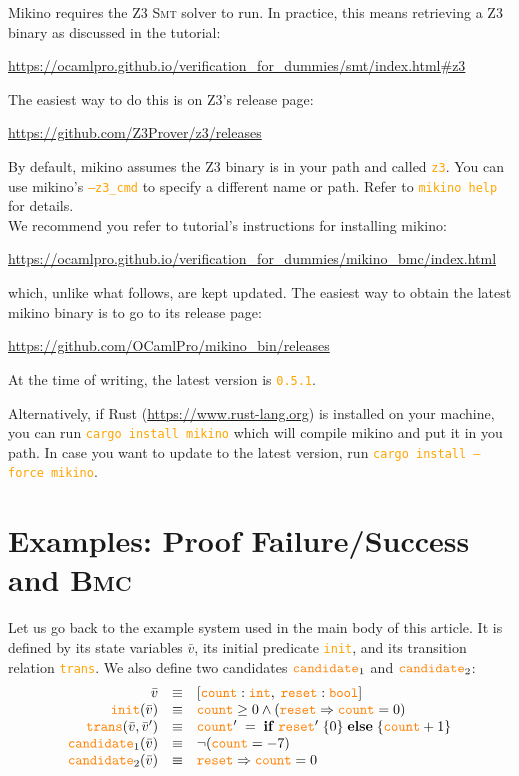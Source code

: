 \documentclass{easychair}
\newcommand{\Mkn}{Mikino}
\newcommand{\mkn}{mikino}
\newcommand{\rust}{Rust}
\newcommand{\smt}{\textsc{Smt}}
\newcommand{\bmc}{\textsc{Bmc}}
\newcommand{\mbld}[1]{\mathbf{#1}}
\newcommand{\code}[1]{\textcolor{orange}{\texttt{#1}}}
\newcommand{\vars}{\bar{v}}
\newcommand{\tyint}{\code{int}}
\newcommand{\tybool}{\code{bool}}
\newcommand{\init}{\code{init}}
\newcommand{\trans}{\code{trans}}
\newcommand{\cand}{\code{candidate}}
\newcommand{\impl}{\Rightarrow}
\begin{document}
\Mkn{} requires the Z3 \smt{} solver to run. In practice, this means retrieving a Z3 binary as
discussed in the tutorial:
%
\begin{center}
    \url{https://ocamlpro.github.io/verification_for_dummies/smt/index.html\#z3}
\end{center}
%
The easiest way to do this is on Z3's release page:
%
\begin{center}
    \url{https://github.com/Z3Prover/z3/releases}
\end{center}
%
By default, \mkn{} assumes the Z3 binary is in your path and called \code{z3}. You can use \mkn{}'s
\code{--z3\_cmd} to specify a different name or path. Refer to \code{mikino help} for details.
%
\\
%
We recommend you refer to tutorial's instructions for installing \mkn{}:
%
\begin{center}
    \url{https://ocamlpro.github.io/verification_for_dummies/mikino_bmc/index.html}%
\end{center}
%
which, unlike what follows, are kept updated. The easiest way to obtain the latest \mkn{} binary is
to go to its release page:
%
\begin{center}
    \url{https://github.com/OCamlPro/mikino_bin/releases}
\end{center}
%
At the time of writing, the latest version is \code{0.5.1}.

Alternatively, if \rust{} (\url{https://www.rust-lang.org}) is installed on your machine, you can
run \code{cargo install mikino} which will compile \mkn{} and put it in you path. In case you want
to update to the latest version, run \code{cargo install --force mikino}.

\section{Examples: Proof Failure/Success and \bmc{}}%
\label{app:example}

Let us go back to the example system used in the main body of this article. It is defined by its
state variables \(\vars\), its initial predicate \init{}, and its transition relation \trans{}.
We also define two candidates \(\cand_1\) and \(\cand_2\):
%
\[\begin{array}{r c l}
    \vars
        & \equiv
        & [ \code{count}: \tyint,\; \code{reset}: \tybool ]
    \\
    \init(\vars)
        & \equiv
        & \code{count} \geq 0 \land (\code{reset} \impl \code{count} = 0)
    \\
    \trans(\vars, \vars')
        & \equiv
        & \code{count}' \;=\;
            \mbld{if} \; \code{reset}' \; \{ 0 \} \;
            \mbld{else} \; \{ \code{count} + 1 \}
    \\
    \cand_1(\vars)
        & \equiv
        & \neg(\code{count} = -7)
    \\
    \cand_2(\vars)
        & \equiv
        & \code{reset} \impl \code{count} = 0
    \\
\end{array}\]
\end{document}
